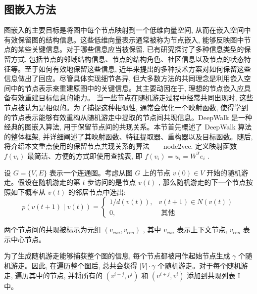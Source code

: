 \subsection{图嵌入方法}
图嵌入的主要目标是将图中每个节点映射到一个低维向量空间, 从而在嵌入空间中有效保留图的结构信息。这些低维向量表示通常被称为节点嵌入, 能够反映图中节点的某些关键信息。对于哪些信息应当被保留, 已有研究探讨了多种信息类型的保留方式, 包括节点的邻域结构信息、节点的结构角色、社区信息以及节点的状态特征等。至于如何有效地保留这些信息, 近年来提出的多种技术方案对如何保留这些信息做出了回应。尽管具体实现细节各异, 但大多数方法的共同理念是利用嵌入空间中的节点表示来重建原图中的关键信息。其主要动因在于, 理想的节点嵌入应具备有效重建目标信息的能力。
当一些节点在随机游走过程中经常共同出现时, 这些节点被认为是相似的。为了捕捉这种相似性, 通常会优化一个映射函数, 使得学到的节点表示能够有效重构从随机游走中提取的节点间共现信息。DeepWalk \parencite{2014_Perozzi_DeepWalk_Online_Learning_of_Social_Representations} 是一种经典的图嵌入算法, 用于保留节点间的共现关系。本节首先概述了 DeepWalk 算法的整体框架, 并详细阐述了其映射函数、特征提取器、重构器以及目标函数。随后, 将介绍本文重点使用的保留节点共现关系的算法——node2vec.
定义映射函数 \(f\left( {v}_{i}\right)\) 最简洁、方便的方式即使用查找表, 即 \(f\left( {v}_{i}\right)  = {u}_{i} = {W}^{T}{e}_{i}\) .

设 \({G} = \{ {V}, {E}\}\) 表示一个连通图。考虑从图 \({G}\) 上的节点 \({v}\left( 0\right)  \in  {V}\) 开始的随机游走。假设在随机游走的第 \({t}\) 步访问的是节点 \({v}\left( {t}\right)\) , 那么随机游走的下一个节点按照如下概率从 \({v}\left( {t}\right)\) 的邻居节点中选出:
\[
p\left( {v\left( {t + 1}\right)  \mid  v\left( t\right) }\right)  = \left\{  \begin{matrix} 1/d\left( {v\left( t\right) }\right), & v\left( {t + 1}\right)  \in  N\left( {v\left( t\right) }\right) \\  0, & \text{ 其他 } \end{matrix}\right.
\]

两个节点间的共现被标示为元组 \(\left( {{{v}}_{{{con}}}, {{v}}_{{{cen}}}}\right)\) , 其中 \({{v}}_{{{con}}}\) 表示上下文节点, \({{v}}_{{{cen}}}\) 表示中心节点。

为了生成随机游走能够捕获整个图的信息, 每个节点都被用作起始节点生成 \(\gamma\) 个随机游走。因此, 在遍历整个图后, 总共会获得 \(\left| V\right|  \cdot  \gamma\) 个随机游走。对于每个随机游走, 遍历其中的节点, 并将所有的 \(\left( {{{v}}^{{i} - {j}}, {{v}}^{{i}}}\right)\) 和 \(\left( {{{v}}^{{i} + {j}}, {{v}}^{{i}}}\right)\) 添加到共现列表 I 中。

